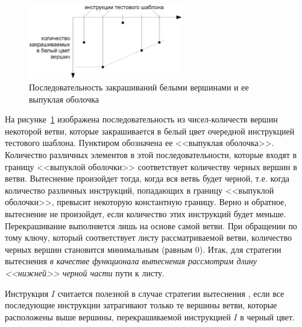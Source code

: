 \begin{figure}[h] \center
  \includegraphics[width=0.6\textwidth]{2.theor/white_feeds}
  \caption{Последовательность закрашиваний белыми вершинами и ее выпуклая
оболочка}\label{fig:white-feeds}
\end{figure}

На рисунке~\ref{fig:white-feeds} изображена последовательность из
чисел-количеств вершин некоторой ветви, которые закрашивается в белый цвет
очередной инструкцией тестового шаблона. Пунктиром обозначена ее <<выпуклая
оболочка>>. Количество различных элементов в этой последовательности, которые
входят в границу <<выпуклой оболочки>> соответствует количеству черных вершин в
ветви. Вытеснение произойдет тогда, когда вся ветвь будет черной, т.е. когда
количество различных инструкций, попадающих в границу <<выпуклой оболочки>>,
превысит некоторую константную границу. Верно и обратное, вытеснение не
произойдет, если количество этих инструкций будет меньше. Перекрашивание
выполняется лишь на основе самой ветви. При обращении по тому ключу, который
соответствует листу рассматриваемой ветви, количество черных вершин становится
минимальным (равным 0). Итак, для стратегии вытеснения \PseudoLRU \emph{в
качестве функционала вытеснения рассмотрим длину <<нижней>> черной части} пути к
листу.

%

\begin{utv}
Инструкция $I$ считается полезной в случае стратегии вытеснения
\PseudoLRU, если все последующие инструкции затрагивают только те
вершины ветви, которые расположены выше вершины, перекрашиваемой инструкцией $I$
в черный цвет.
\end{utv}

